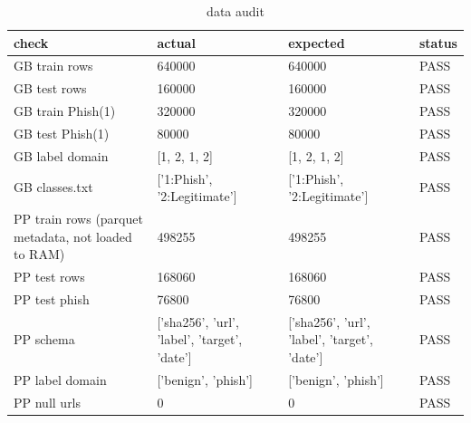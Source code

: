 \begin{table}[htbp]
\caption{data audit}
\label{tab:data_audit}
\begin{tabular}{llll}
\toprule
check & actual & expected & status \\
\midrule
GB train rows & 640000 & 640000 & PASS \\
GB test rows & 160000 & 160000 & PASS \\
GB train Phish(1) & 320000 & 320000 & PASS \\
GB test Phish(1) & 80000 & 80000 & PASS \\
GB label domain & [1, 2, 1, 2] & [1, 2, 1, 2] & PASS \\
GB classes.txt & ['1:Phish', '2:Legitimate'] & ['1:Phish', '2:Legitimate'] & PASS \\
PP train rows (parquet metadata, not loaded to RAM) & 498255 & 498255 & PASS \\
PP test rows & 168060 & 168060 & PASS \\
PP test phish & 76800 & 76800 & PASS \\
PP schema & ['sha256', 'url', 'label', 'target', 'date'] & ['sha256', 'url', 'label', 'target', 'date'] & PASS \\
PP label domain & ['benign', 'phish'] & ['benign', 'phish'] & PASS \\
PP null urls & 0 & 0 & PASS \\
\bottomrule
\end{tabular}
\end{table}
